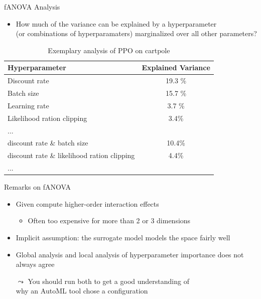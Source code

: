 \begin{frame}[c,fragile]{fANOVA Analysis}

\begin{itemize}
	\item 	How much of the variance can be explained by a hyperparameter\\
	 (or combinations of hyperparamaters) marginalized over all other parameters?
\end{itemize}

\begin{table}
	\caption{Exemplary analysis of PPO on cartpole}
	\begin{tabular}{lc}
		\toprule
		Hyperparameter & Explained Variance \\
		\midrule
		Discount rate & 19.3 \%\\
		Batch size & 15.7 \% \\
		Learning rate & 3.7 \% \\
		Likelihood ration clipping & 3.4\% \\
		... \\
		\midrule
		\pause
		discount rate \& batch size & 10.4\% \\
		discount rate \& likelihood ration clipping & 4.4\% \\
		... \\
		\bottomrule
	\end{tabular}
\end{table}
	

\end{frame}


\begin{frame}[c,fragile]{Remarks on fANOVA}

\begin{itemize}
	\item Given compute higher-order interaction effects
	\begin{itemize}
		\item Often too expensive for more than 2 or 3 dimensions
	\end{itemize}
	\medskip
	\pause
	\item Implicit assumption: the surrogate model models the space fairly well
	\medskip
	\pause
	\item Global analysis and local analysis of hyperparameter importance does not always agree 
	\smallskip
	\pause
	\item[$\leadsto$] You should run both to get a good understanding of\\
	 why an AutoML tool chose  a configuration
\end{itemize}

\end{frame}



